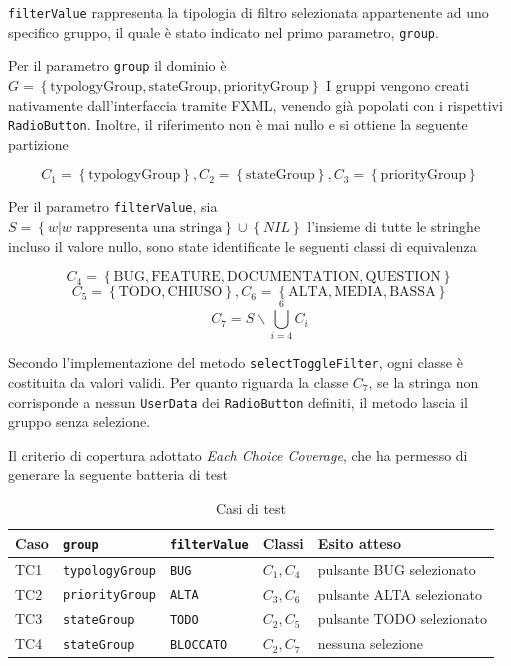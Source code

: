 \noindent\texttt{filterValue} rappresenta la tipologia di filtro selezionata appartenente ad uno specifico
gruppo, il quale è stato indicato nel primo parametro, \texttt{group}.

Per il parametro \texttt{group} il dominio è 
$G = \left\{ \text{typologyGroup}, \text{stateGroup},\text{priorityGroup}\right\}$ 
I gruppi vengono creati nativamente dall'interfaccia tramite FXML, venendo 
già popolati con i rispettivi \texttt{RadioButton}. Inoltre, il riferimento
non è mai nullo e si ottiene la seguente partizione

\noindent$$C_{1} =\left\{\text{typologyGroup}\right\},
C_{2} =\left\{\text{stateGroup}\right\},
C_{3} =\left\{\text{priorityGroup}\right\}$$

\noindent Per il parametro \texttt{filterValue}, sia $S = \left\{ w|w \text{ rappresenta una stringa} \right\}\cup \left\{ \textit{NIL} \right\}$  
l'insieme di tutte le stringhe incluso il valore nullo, sono state identificate
le seguenti classi di equivalenza

\noindent$$C_{4} =\left\{\text{BUG},\text{FEATURE},\text{DOCUMENTATION},\text{QUESTION}\right\}$$
$$C_{5} =\left\{\text{TODO},\text{CHIUSO}\right\},C_{6} =\left\{\text{ALTA},\text{MEDIA},\text{BASSA}\right\}$$
$$C_{7} = S\smallsetminus \bigcup_{i=4}^{6}C_{i}$$

\noindent Secondo l'implementazione del metodo \texttt{selectToggleFilter}, ogni classe è costituita da valori validi.
Per quanto riguarda la classe $C_7$, se la stringa non corrisponde a nessun \texttt{UserData} dei 
\texttt{RadioButton} definiti, il metodo lascia il gruppo senza selezione.

\noindent Il criterio di copertura adottato \textit{Each Choice Coverage}, che ha permesso
di generare la seguente batteria di test

\begin{table}[ht]
  \centering
  \small
  \caption{Casi di test}
  \label{tab:test-selecttogglefilter}
  \begin{tabular}{@{}llllp{4cm}@{}}
    \toprule
    Caso & \texttt{group} & \texttt{filterValue} & Classi & Esito atteso \\
    \midrule
    TC1 & \texttt{typologyGroup} & \texttt{BUG}  & $C_1, C_4$ & pulsante BUG selezionato  \\
    TC2 & \texttt{priorityGroup} & \texttt{ALTA} & $C_3, C_6$ & pulsante ALTA selezionato \\
    TC3 & \texttt{stateGroup}    & \texttt{TODO} & $C_2, C_5$ & pulsante TODO selezionato \\
    TC4 & \texttt{stateGroup} & \texttt{BLOCCATO}  & $C_2, C_7$ & nessuna selezione         \\
    \bottomrule
  \end{tabular}
\end{table}

